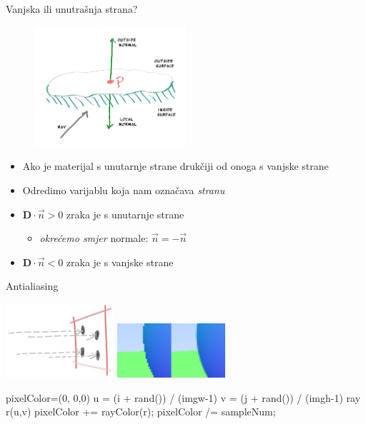 \documentclass[9pt]{beamer}
\begin{document}
\begin{frame}{Vanjska ili unutrašnja strana?}
	\begin{figure}
		\includegraphics[width=0.5\textwidth]{./slike/normal-possibilities.png}
	\end{figure}
	\begin{itemize}
		\item Ako je materijal s unutarnje strane drukčiji od onoga s vanjske strane
		\item Odredimo varijablu koja nam označava \textit{stranu}
		\item $\mathbf{D}\cdot \vec{n} >0$ zraka je s unutarnje strane
		\begin{itemize}
			\item \textit{okrećemo smjer} normale: $\vec{n} = -\vec{n}$
		\end{itemize}
		\item $\mathbf{D}\cdot \vec{n} <0$ zraka je s vanjske strane
	\end{itemize}
\end{frame}	

\begin{frame}{Antialiasing}
	\begin{center}
		\includegraphics[width=0.3\textwidth]{./slike/pixel-samples.png}
		\qquad \qquad
		\includegraphics[width=0.3\textwidth]{./slike/img-1.06-antialias-before-after.png}
	\end{center}

	\begin{algorithm}[H]
		{
			pixelColor=(0, 0,0)\;
			{
				u = (i + rand()) / (imgw-1)\;
				v = (j + rand()) / (imgh-1)\;
				ray r(u,v)\;
				pixelColor += rayColor(r);
			}
			pixelColor /= sampleNum;
		}
	\end{algorithm}\end{frame}
\end{document}
